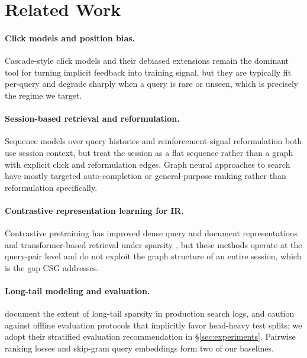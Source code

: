 \section{Related Work}
\label{sec:related}

\paragraph{Click models and position bias.} Cascade-style click models
\citep{Feld2017ClickModel} and their debiased extensions \citep{Sundqvist2015Debiasing}
remain the dominant tool for turning implicit feedback into training signal, but they
are typically fit per-query and degrade sharply when a query is rare or unseen, which
is precisely the regime we target.

\paragraph{Session-based retrieval and reformulation.} Sequence models over query
histories \citep{Feldman2018Embeddings} and reinforcement-signal reformulation
\citep{Csikos2021Reformulation} both use session context, but treat the session as a
flat sequence rather than a graph with explicit click and reformulation edges. Graph
neural approaches to search have mostly targeted auto-completion
\citep{Bauer2019GNN} or general-purpose ranking \citep{Rajan2021GraphRank} rather than
reformulation specifically.

\paragraph{Contrastive representation learning for IR.} Contrastive pretraining has
improved dense query and document representations \citep{Lindqvist2020Contrastive}
and transformer-based retrieval under sparsity \citep{Marsh2022BertRetrieval}, but
these methods operate at the query-pair level and do not exploit the graph structure
of an entire session, which is the gap CSG addresses.

\paragraph{Long-tail modeling and evaluation.} \citet{Okonkwo2018LongTail} document
the extent of long-tail sparsity in production search logs, and
\citet{Delacroix2020Evaluation} caution against offline evaluation protocols that
implicitly favor head-heavy test splits; we adopt their stratified evaluation
recommendation in \S\ref{sec:experiments}. Pairwise ranking losses
\citep{Whitfield2016RankNet} and skip-gram query embeddings
\citep{Feldman2018Embeddings} form two of our baselines.
